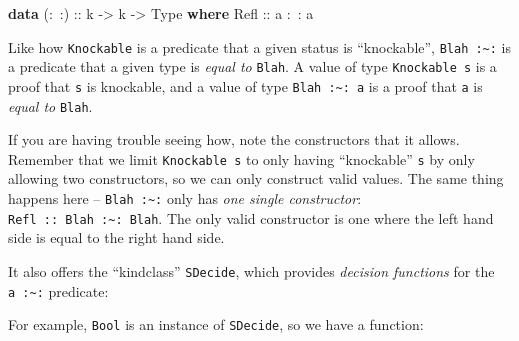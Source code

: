 \documentclass[]{article}
\newenvironment{Shaded}{}{}
\newcommand{\DataTypeTok}[1]{\textcolor[rgb]{0.56,0.13,0.00}{#1}}
\newcommand{\FunctionTok}[1]{\textcolor[rgb]{0.02,0.16,0.49}{#1}}
\newcommand{\KeywordTok}[1]{\textcolor[rgb]{0.00,0.44,0.13}{\textbf{#1}}}
\newcommand{\NormalTok}[1]{#1}
\newcommand{\OtherTok}[1]{\textcolor[rgb]{0.00,0.44,0.13}{#1}}
\begin{document}
\begin{Shaded}
\begin{Highlighting}[]
\KeywordTok{data}\OtherTok{ (:~:) ::}\NormalTok{ k }\OtherTok{->}\NormalTok{ k }\OtherTok{->} \DataTypeTok{Type} \KeywordTok{where}
    \DataTypeTok{Refl}\OtherTok{ ::}\NormalTok{ a }\FunctionTok{:~:}\NormalTok{ a}
\end{Highlighting}
\end{Shaded}

Like how \texttt{Knockable} is a predicate that a given status is ``knockable'',
\texttt{\textquotesingle{}Blah\ :\textasciitilde{}:} is a predicate that a given
type is \emph{equal to} \texttt{\textquotesingle{}Blah}. A value of type
\texttt{Knockable\ s} is a proof that \texttt{s} is knockable, and a value of
type \texttt{\textquotesingle{}Blah\ :\textasciitilde{}:\ a} is a proof that
\texttt{a} is \emph{equal to} \texttt{\textquotesingle{}Blah}.

If you are having trouble seeing how, note the constructors that it allows.
Remember that we limit \texttt{Knockable\ s} to only having ``knockable''
\texttt{s} by only allowing two constructors, so we can only construct valid
values. The same thing happens here --
\texttt{\textquotesingle{}Blah\ :\textasciitilde{}:} only has \emph{one single
constructor}:
\texttt{Refl\ ::\ \textquotesingle{}Blah\ :\textasciitilde{}:\ \textquotesingle{}Blah}.
The only valid constructor is one where the left hand side is equal to the right
hand side.

It also offers the ``kindclass'' \texttt{SDecide}, which provides \emph{decision
functions} for the \texttt{a\ :\textasciitilde{}:} predicate:

\begin{Shaded}
\end{Shaded}

For example, \texttt{Bool} is an instance of \texttt{SDecide}, so we have a
function:

\begin{Shaded}
\end{Shaded}
\end{document}
